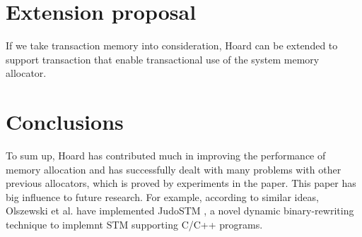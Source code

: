 \documentclass[10pt, letterpaper]{article}
\begin{document}
\section{Extension proposal}
If we take transaction memory into consideration, Hoard can be extended to support transaction that enable
transactional use of the system memory allocator.

\section{Conclusions}
To sum up, Hoard has contributed much in improving the performance of memory allocation and has successfully
dealt with many problems with other previous allocators, which is proved by experiments in the paper. This paper
has big influence to future research. For example, according to similar ideas, Olszewski et al. have implemented JudoSTM
\cite{olszewski2007judostm}, a novel dynamic binary-rewriting technique to implemnt STM supporting C/C++
programs. 



\end{document}
